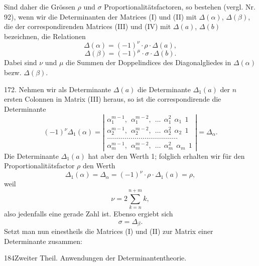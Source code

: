 Sind daher die Grössen $\rho$ und $\sigma$ Proportionalitätsfactoren, so bestehen (vergl. Nr. 92), wenn wir die Determinanten der Matrices
(I) und (II) mit $\Delta(\alpha)$, $\Delta(\beta)$, die der correspondirenden Matrices (III)
und (IV) mit $\Delta(a)$, $\Delta(b)$ bezeichnen, die Relationen
\[
\Delta(\alpha) = (-1)^\nu\cdot\rho\cdot\Delta(a),
\]
\[
\Delta(\beta) = (-1)^\mu\cdot\sigma\cdot\Delta(b).
\]
Dabei sind $\nu$ und $\mu$ die Summen der Doppelindices des Diagonalgliedes in $\Delta(\alpha)$ bezw. $\Delta(\beta)$.

172. Nehmen wir als Determinante $\Delta(a)$ die Determinante $\Delta_1(a)$
der $n$ ersten Colonnen in Matrix (III) heraus, so ist die correspondirende die Determinante
\[
(-1)^\nu\Delta_1(\alpha) =
\left|\begin{array}{l}
\alpha_1^{m-1},\ \ \alpha_1^{m-2},\ \ \ldots\ \ \alpha_1^{2}\ \ \alpha_1\ \ 1\\
\alpha_2^{m-1},\ \ \alpha_2^{m-2},\ \ \ldots\ \ \alpha_2^{2}\ \ \alpha_2\ \ 1\\
\ldots\ldots\ldots\ldots\ldots\ldots\ldots\ldots\ldots\ldots\ldots\ldots\\
\alpha_m^{m-1},\ \ \alpha_m^{m-2},\ \ \ldots\ \ \alpha_m^{2}\ \ \alpha_m\ \ 1
\end{array}\right|
= \Delta_\alpha.
\]
Die Determinante $\Delta_1(a)$ hat aber den Werth 1; folglich erhalten wir
für den Proportionalitätsfactor $\rho$ den Werth
\[
\Delta_1(\alpha) = \Delta_\alpha = (-1)^\nu\cdot\rho\cdot\Delta_1(a) = \rho,
\]
weil
\[
\nu = 2\sum_{k=n}^{n+m} k,
\]
also jedenfalls eine gerade Zahl ist. Ebenso ergiebt sich
\[
\sigma = \Delta_\beta.
\]
Setzt man nun einestheils die Matrices (I) und (II) zur Matrix einer
Determinante zusammen:


184\quad Zweiter Theil. Anwendungen der Determinantentheorie.

